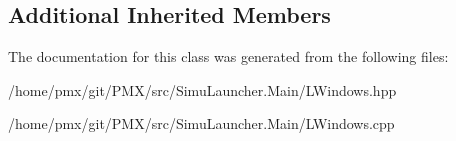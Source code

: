 \subsection*{Additional Inherited Members}


The documentation for this class was generated from the following files\+:\begin{DoxyCompactItemize}
\item 
/home/pmx/git/\+P\+M\+X/src/\+Simu\+Launcher.\+Main/L\+Windows.\+hpp\item 
/home/pmx/git/\+P\+M\+X/src/\+Simu\+Launcher.\+Main/L\+Windows.\+cpp\end{DoxyCompactItemize}
